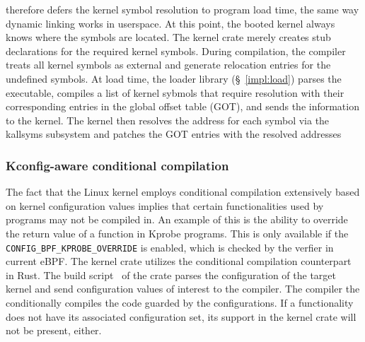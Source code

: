 \projname{} therefore defers the kernel symbol resolution to program load time,
    the same way dynamic linking works in userspace.
At this point, the booted kernel always knows where the symbols are located.
The \projname{} kernel crate merely creates stub declarations for the required
    kernel symbols.
During compilation, the compiler treats all kernel symbols as external and
    generate relocation entries for the undefined symbols.
At load time, the loader library (\S~\ref{impl:load}) parses the executable,
    compiles a list of kernel sybmols that require resolution with their
    corresponding entries in the global offset table (GOT), and sends the
    information to the kernel.
The kernel then resolves the address for each symbol via the kallsyms subsystem
    and patches the GOT entries with the resolved addresses

\subsubsection{Kconfig-aware conditional compilation}
The fact that the Linux kernel employs conditional compilation extensively
    based on kernel configuration values implies that certain functionalities
    used by \projname{} programs may not be compiled in.
An example of this is the ability to override the return value of a function in
    Kprobe programs.
This is only available if the \texttt{CONFIG\_BPF\_KPROBE\_OVERRIDE} is
    enabled, which is checked by the verfier in current eBPF.
The \projname{} kernel crate utilizes the conditional compilation counterpart
    in Rust.
The build script~\cite{rust-build-script} of the crate parses the configuration
    of the target kernel and send configuration values of interest to the
    compiler.
The compiler the conditionally compiles the code guarded by the configurations.
If a functionality does not have its associated configuration set, its support
    in the kernel crate will not be present, either.

